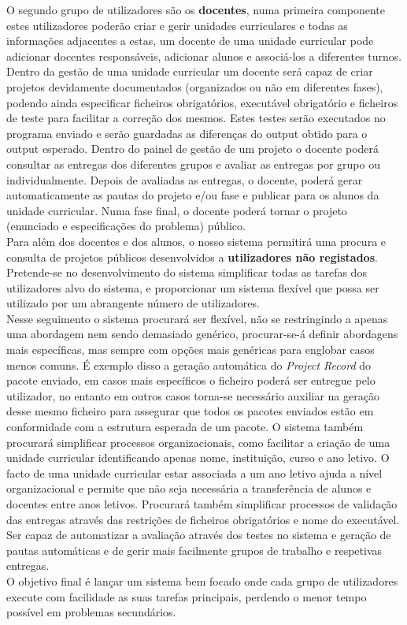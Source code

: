 O segundo grupo de utilizadores são os \textbf{docentes}, numa primeira componente estes utilizadores poderão criar e gerir unidades curriculares e todas as informações adjacentes a estas, um docente de uma unidade curricular pode adicionar docentes responsáveis, adicionar alunos e associá­-los a diferentes turnos. Dentro da gestão de uma unidade curricular um docente será capaz de criar projetos devidamente documentados (organizados ou não em diferentes fases), podendo ainda especificar ficheiros obrigatórios, executável obrigatório e ficheiros de teste para facilitar a correção dos mesmos. Estes testes serão executados no programa enviado e serão guardadas as diferenças do output obtido para o output esperado. Dentro do painel de gestão de um projeto o docente poderá consultar as entregas dos diferentes grupos e avaliar as entregas por grupo ou individualmente. Depois de avaliadas as entregas, o docente, poderá gerar automaticamente as pautas do projeto e/ou fase e publicar para os alunos da unidade curricular.
Numa fase final, o docente poderá tornar o projeto (enunciado e especificações do problema) público.\\

Para além dos docentes e dos alunos, o nosso sistema permitirá uma procura e consulta de projetos públicos desenvolvidos a \textbf{utilizadores não registados}.\\

Pretende-se no desenvolvimento do sistema simplificar todas as tarefas dos utilizadores alvo do sistema, e proporcionar um sistema flexível que possa ser utilizado por um abrangente número de utilizadores.\\

Nesse seguimento o sistema procurará ser flexível, não se restringindo a apenas uma abordagem nem sendo demasiado genérico, procurar-se-á definir abordagens mais específicas, mas sempre com opções mais genéricas para englobar casos menos comuns. É exemplo disso a geração automática do \textit{Project Record} do pacote enviado, em casos mais específicos o ficheiro poderá ser entregue pelo utilizador, no entanto em outros casos torna-se necessário auxiliar na geração desse mesmo ficheiro para assegurar que todos os pacotes enviados estão em conformidade com a estrutura esperada de um pacote. O sistema também procurará simplificar processos organizacionais, como facilitar a criação de uma unidade curricular identificando apenas nome, instituição, curso e ano letivo. O facto de uma unidade curricular estar associada a um ano letivo ajuda a nível organizacional e permite que não seja necessária a transferência de alunos e docentes entre anos letivos. Procurará também simplificar processos de validação das entregas através das restrições de ficheiros obrigatórios e nome do executável. Ser capaz de automatizar a avaliação através dos testes no sistema e geração de pautas automáticas e de gerir mais facilmente grupos de trabalho e respetivas entregas.\\

O objetivo final é lançar um sistema bem focado onde cada grupo de utilizadores execute com facilidade as suas tarefas principais, perdendo o menor tempo possível em problemas secundários. 

\newpage